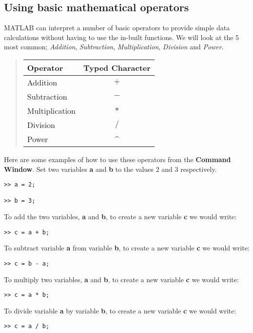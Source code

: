 \documentclass[12pt,a4paper]{article}
\begin{document}
\subsection{Using basic mathematical operators}
MATLAB can interpret a number of basic operators to provide simple data calculations without having to use the in-built functions.  We will look at the 5 most common; \emph{Addition}, \emph{Subtraction}, \emph{Multiplication}, \emph{Division} and \emph{Power}.
\begin{quotation}
\begin{tabular}{l c}
\toprule
Operator & Typed Character \\
\midrule
Addition & $+$\\
Subtraction & $-$\\
Multiplication & $*$\\
Division & $/$\\
Power & \textasciicircum \\
\bottomrule
\end{tabular}
\end{quotation}	
	
Here are some examples of how to use these operators from the \textbf{Command Window}.  Set two variables \textbf{a} and \textbf{b} to the values 2 and 3 respectively.
\begin{lstlisting}[style=Matlab-editor]
>> a = 2;

>> b = 3;
\end{lstlisting}

To add the two variables, \textbf{a} and \textbf{b}, to create a new variable \textbf{c} we would write:
\begin{lstlisting}[style=Matlab-editor]
>> c = a + b;
\end{lstlisting}

To subtract variable \textbf{a} from variable \textbf{b}, to create a new variable \textbf{c} we would write:
\begin{lstlisting}[style=Matlab-editor]
>> c = b - a;
\end{lstlisting}

To multiply two variables, \textbf{a} and \textbf{b}, to create a new variable \textbf{c} we would write:
\begin{lstlisting}[style=Matlab-editor]
>> c = a * b;
\end{lstlisting}

To divide variable \textbf{a} by variable \textbf{b}, to create a new variable \textbf{c} we would write:
\begin{lstlisting}[style=Matlab-editor]
>> c = a / b;
\end{lstlisting}
\end{document}
